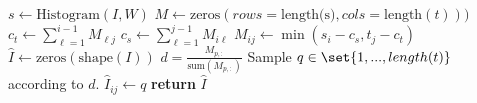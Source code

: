\begin{algorithmic}[1]
  \State $s \gets \text{Histogram}(I, W)$
  \State $M \gets \text{zeros}(rows=\text{length(s)}, cols=\text{length}(t)))$ 
      \State $c_t \gets \sum_{\ell = 1}^{i-1} M_{\ell j}$
      \State $c_s \gets \sum_{\ell = 1}^{j-1} M_{i \ell}$
      \State $M_{ij} \gets \min(s_i - c_s, t_j - c_t)$
    \EndFor
  \EndFor
  \State $\hat I \gets \text{zeros}(\text{shape}(I))$
    \State $d = \frac{M_{p,:}}{\text{sum}(M_{p,:})}$ 
    \State Sample $q \in \set{1,...,length(t)}$ according to $d$.
    \State $\hat I_{ij} \gets q$
  \EndFor
  \State \textbf{return} $\hat I$
  \EndProcedure
\end{algorithmic}
  